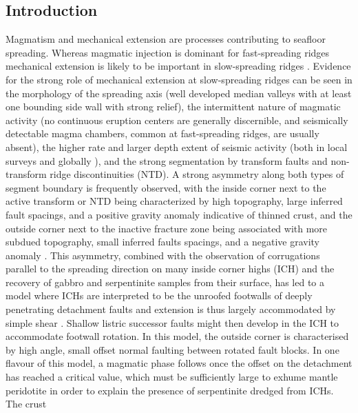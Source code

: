 \documentclass[jgr]{agu2001}
\newlength{\tw}
\begin{document}
\begin{article}

\section{Introduction}

Magmatism and mechanical extension are 
 processes contributing to  seafloor spreading.  Whereas magmatic injection is dominant for
fast-spreading ridges mechanical extension is likely to be important
in slow-spreading ridges  \citep{mutter92}.  Evidence for the strong
role of mechanical extension at slow-spreading ridges can be seen in the morphology of the
spreading axis (well developed median valleys with at least one
bounding side wall with strong relief), the intermittent nature of
magmatic activity (no continuous eruption centers are generally 
discernible, and seismically detectable magma chambers, common at
fast-spreading ridges, are usually absent), the higher rate and larger
depth extent of seismic activity (both in local surveys
\citep[e.g.,][]{toomey88} and globally \citep{huang88,rundquist02}),
and the strong segmentation by transform faults and non-transform
ridge discontinuities (NTD). A strong asymmetry along both types of
segment boundary is frequently observed, with the inside corner next
to the active transform or NTD being
characterized  by high topography, large inferred fault spacings, and a positive gravity anomaly
indicative of thinned crust, and the outside corner next to the
inactive fracture zone being associated with more subdued topography,
small inferred faults spacings, 
and a negative gravity anomaly \citep{shaw93,escartin95}. This asymmetry,
combined with the observation of corrugations parallel to the
spreading direction on many inside corner highs (ICH) and the
recovery of gabbro and serpentinite samples from their surface, has
led to a model where ICHs are interpreted to be the unroofed footwalls
of  deeply penetrating detachment faults and  extension
is thus largely accommodated by simple shear
\citep{tucholke94}. Shallow listric successor faults might then
develop in the ICH to accommodate footwall rotation.  In this model, the outside
corner is characterised by high angle, small offset normal faulting
between rotated fault blocks. In one flavour of this model, a magmatic
phase follows once the offset on the detachment has reached a critical
value, which must be sufficiently large to exhume mantle peridotite in
order to explain the presence of serpentinite dredged from ICHs. The crust 

\end{article}
\end{document}
